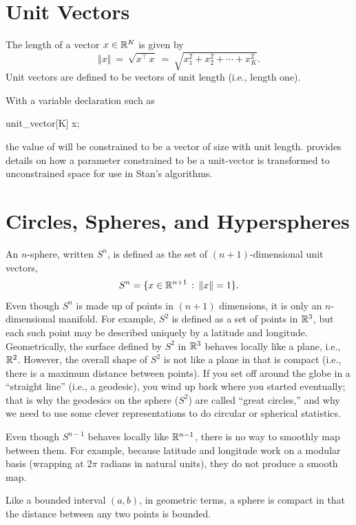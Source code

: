 \section{Unit Vectors}  

The length of a vector $x \in \reals^K$ is given by
\[
\Vert x \Vert
\ = \ \sqrt{x^{\top}\,x}
\ = \ \sqrt{x_1^2 + x_2^2 + \cdots + x_K^2}.
\]
Unit vectors are defined to be vectors of unit length (i.e., length
one).

With a variable declaration such as
%
\begin{stancode}
unit_vector[K] x;
\end{stancode}
%
the value of  will be constrained to be a vector of size
 with unit length.   provides details
on how a parameter constrained to be a unit-vector is transformed to
unconstrained space for use in Stan's algorithms.

\section{Circles, Spheres, and Hyperspheres}

An $n$-sphere, written $S^{n}$, is defined as the set of $(n +
1)$-dimensional unit vectors,
\[
S^{n} = \{ x \in \reals^{n+1} \, : \, \Vert x \Vert = 1 \}.
\]
%
Even though $S^n$ is made up of points in $(n+1)$ dimensions, it is
only an $n$-dimensional manifold.  For example, $S^2$ is defined as a
set of points in $\reals^3$, but each such point may be described
uniquely by a latitude and longitude.  Geometrically, the surface
defined by $S^2$ in $\reals^3$ behaves locally like a plane, i.e.,
$\reals^2$.  However, the overall shape of $S^2$ is not like a plane
in that is compact (i.e., there is a maximum distance between points).
If you set off around the globe in a ``straight line'' (i.e., a
geodesic), you wind up back where you started eventually; that is why
the geodesics on the sphere ($S^2$) are called ``great circles,'' and
why we need to use some clever representations to do circular or
spherical statistics.

Even though $S^{n-1}$ behaves locally like $\reals^{n-1}$, there is no
way to smoothly map between them. For example, because
latitude and longitude work on a modular basis (wrapping at $2\pi$
radians in natural units), they do not produce a smooth map. 

Like a bounded interval $(a, b)$, in geometric terms, a sphere is
compact in that the distance between any two points is bounded.


